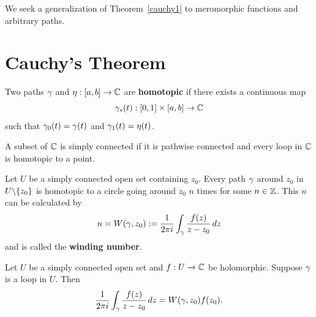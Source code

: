 We seek a generalization of Theorem~\ref{cauchy1} to meromorphic functions and arbitrary paths. 
\section{Cauchy's Theorem}
\begin{df}
Two paths $\gamma$ and $\eta:[a,b]\to \mathbb{C}$ are \textbf{homotopic} if there exists a continuous map
\[
\gamma_s(t):[0,1]\times [a,b]\to \mathbb{C}
\]
such that $\gamma_0(t)=\gamma(t)$ and $\gamma_1(t)=\eta(t)$.

A subset of $\mathbb{C}$ is simply connected if it is pathwise connected and every loop in $\mathbb{C}$ is homotopic to a point.
\end{df}
\begin{thm}
Let $U$ be a simply connected open set containing $z_0$. 
Every path $\gamma$ around $z_0$ in $U\backslash\{z_0\}$ is homotopic to a circle going around $z_0$ $n$ times for some $n\in \mathbb{Z}$. This $n$ can be calculated by
\[
n=W(\gamma,z_0):=\frac{1}{2\pi i}\int_{\gamma}\frac{f(z)}{z-z_0}\,dz
\]
and is called the \textbf{winding number}.
\end{thm}
\begin{thm}
Let $U$ be a simply connected open set and $f:U\to \mathbb{C}$ be holomorphic. Suppose $\gamma$ is a loop in $U$. Then
\[
\frac{1}{2\pi i}\int_{\gamma} \frac{f(z)}{z-z_0}\,dz=W(\gamma,z_0)f(z_0).
\]
\end{thm}
